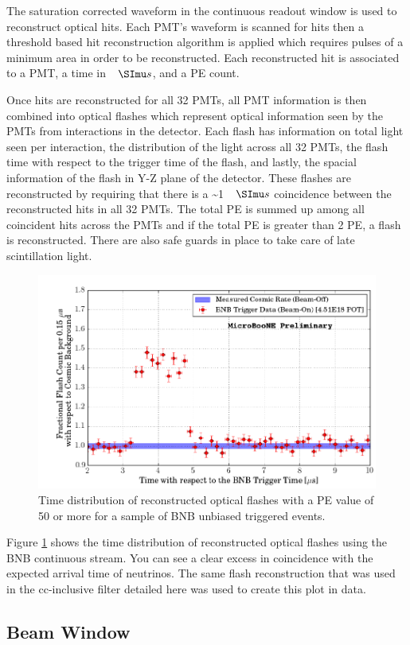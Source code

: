 The saturation corrected waveform in the continuous readout window is used to reconstruct optical hits. Each PMT's waveform is scanned for hits then a threshold based hit reconstruction algorithm is applied which requires pulses of a minimum area in order to be reconstructed. Each reconstructed hit is associated to a PMT, a time in $\micro s$, and a PE count. 

Once hits are reconstructed for all 32 PMTs, all PMT information is then combined into optical flashes which represent optical information seen by the PMTs from interactions in the detector. Each flash has information on total light seen per interaction,  the distribution of the light across all 32 PMTs, the flash time with respect to the trigger time of the flash, and lastly, the spacial information of the flash in Y-Z plane of the detector. These flashes are reconstructed by requiring that there is a \sim 1 $\micro s$ coincidence between the reconstructed hits in all 32 PMTs. The total PE is summed up among all coincident hits across the PMTs and if the total PE is greater than 2 PE, a flash is reconstructed. There are also safe guards in place to take care of late scintillation light.  

\begin{figure}[htp!]
\includegraphics[width=.6\textwidth]{figs/opticaltrigger.png}
\caption{Time distribution of reconstructed optical flashes with a PE value of 50 or more for a sample of BNB unbiased triggered events.}
\label{fig:optrig}
\end{figure}

Figure \ref{fig:optrig} shows the time distribution of reconstructed optical flashes using the BNB continuous stream. You can see a clear excess in coincidence with the expected arrival time of neutrinos. The same flash reconstruction that was used in the cc-inclusive filter detailed here was used to create this plot in data.
\subsection{Beam Window}

